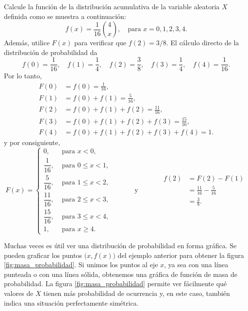 \begin{examplebox}{}{}
    Calcule la función de la distribución acumulativa de la variable aleatoria $X$ definida como se muestra a continuación:
    $$f(x) = \frac{1}{16} \binom{4}{x}, \quad \text{para } x = 0, 1, 2, 3, 4.$$
    Además, utilice $F(x)$ para verificar que $f(2) = 3/8$.
    \tcblower
    \solucion El cálculo directo de la distribución de probabilidad da
    $$f(0) = \frac{1}{16}, \quad f(1) = \frac{1}{4}, \quad f(2) = \frac{3}{8}, \quad f(3) = \frac{1}{4}, \quad f(4) = \frac{1}{16}.$$
    Por lo tanto,
    \begin{align*}
        F(0) & = f(0) = \frac{1}{16}, \\
        F(1) & = f(0) + f(1) = \frac{5}{16}, \\
        F(2) & = f(0) + f(1) + f(2) = \frac{11}{16}, \\
        F(3) & = f(0) + f(1) + f(2) + f(3) = \frac{15}{16}, \\
        F(4) & = f(0) + f(1) + f(2) + f(3) + f(4) = 1.
    \end{align*}
    y por consiguiente,
    $$F(x) = \begin{cases}
        0, & \text{ para } x < 0, \\
        \dfrac{1}{16}, & \text{ para } 0 \leq x < 1, \\[2mm]
        \dfrac{5}{16}, & \text{ para } 1 \leq x < 2, \\[2mm]
        \dfrac{11}{16}, & \text{ para } 2 \leq x < 3, \\[2mm]
        \dfrac{15}{16}, & \text{ para } 3 \leq x < 4, \\[2mm]
        1, & \text{ para } x \geq 4.
    \end{cases} \quad\qquad \text{ y } \quad\qquad \begin{aligned}
        f(2) & = F(2) - F(1) \\
        & = \frac{11}{16} - \frac{5}{16} \\
        & = \frac{3}{8}.
    \end{aligned}$$
\end{examplebox}

\newpage

Muchas veces es útil ver una distribución de probabilidad en forma gráfica. Se pueden
graficar los puntos $\big(x, f (x)\big)$ del ejemplo anterior para obtener la figura \ref{fig:masa_probabilidad}. Si unimos los puntos al eje $x$, ya sea con una línea punteada o con una línea sólida, obtenemos una gráfica de función de masa de probabilidad. La figura \ref{fig:masa_probabilidad} permite ver fácilmente qué valores de $X$ tienen más probabilidad de ocurrencia y, en este caso, también indica una situación perfectamente simétrica.

